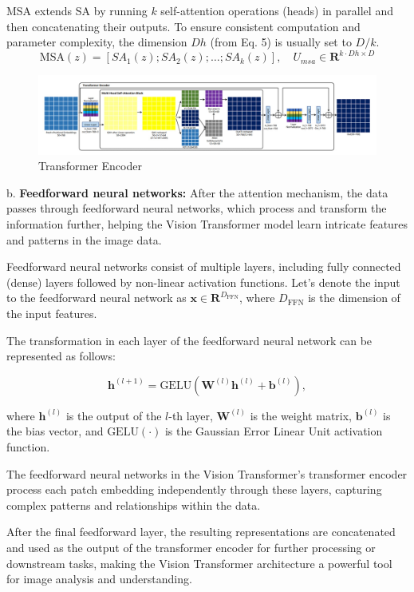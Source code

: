 MSA extends SA by running $k$ self-attention operations (heads) in parallel and then concatenating their outputs. To ensure consistent computation and parameter complexity, the dimension $Dh$ (from Eq. 5) is usually set to $D/k$.
\[
    \text{MSA}(z) = [SA_1(z); SA_2(z); \ldots ; SA_k(z)], \quad U_{msa} \in \mathbf{R}^{k \cdot Dh \times D}
\]
\begin{figure}[htbp]
    \centering
    \includegraphics[width=6in]{img/encoderdetails.jpg}
    \caption{Transformer Encoder}
\end{figure}

\noindent b. \textbf{Feedforward neural networks:} After the attention mechanism, the data passes through feedforward neural networks, which process and transform the information further, helping the Vision Transformer model learn intricate features and patterns in the image data.

Feedforward neural networks consist of multiple layers, including fully connected (dense) layers followed by non-linear activation functions. Let's denote the input to the feedforward neural network as $\mathbf{x} \in \mathbf{R}^{D_{\text{FFN}}}$, where $D_{\text{FFN}}$ is the dimension of the input features.

The transformation in each layer of the feedforward neural network can be represented as follows:

\[
    \mathbf{h}^{(l+1)} = \text{GELU}\left(\mathbf{W}^{(l)} \mathbf{h}^{(l)} + \mathbf{b}^{(l)}\right),
\]

where $\mathbf{h}^{(l)}$ is the output of the $l$-th layer, $\mathbf{W}^{(l)}$ is the weight matrix, $\mathbf{b}^{(l)}$ is the bias vector, and $\text{GELU}(\cdot)$ is the Gaussian Error Linear Unit activation function.

The feedforward neural networks in the Vision Transformer's transformer encoder process each patch embedding independently through these layers, capturing complex patterns and relationships within the data.

After the final feedforward layer, the resulting representations are concatenated and used as the output of the transformer encoder for further processing or downstream tasks, making the Vision Transformer architecture a powerful tool for image analysis and understanding.

